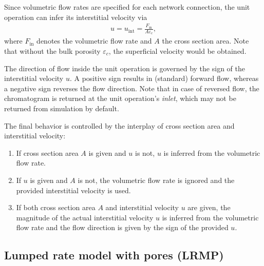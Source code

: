 Since volumetric flow rates are specified for each network connection, the unit operation can infer its interstitial velocity via
\begin{align*}
	u = u_{\text{int}} = \frac{F_{\text{in}}}{A \varepsilon_c},
\end{align*}
where $F_{\text{in}}$ denotes the volumetric flow rate and $A$ the cross section area.
Note that without the bulk porosity $\varepsilon_c$, the superficial velocity would be obtained.

The direction of flow inside the unit operation is governed by the sign of the interstitial velocity $u$.
A positive sign results in (standard) forward flow, whereas a negative sign reverses the flow direction.
Note that in case of reversed flow, the chromatogram is returned at the unit operation's \emph{inlet}, which may not be returned from simulation by default.

The final behavior is controlled by the interplay of cross section area and interstitial velocity:
\begin{enumerate}
	\item If cross section area $A$ is given and $u$ is not, $u$ is inferred from the volumetric flow rate.
	\item If $u$ is given and $A$ is not, the volumetric flow rate is ignored and the provided interstitial velocity is used.
	\item If both cross section area $A$ and interstitial velocity $u$ are given, the magnitude of the actual interstitial velocity $u$ is inferred from the volumetric flow rate and the flow direction is given by the sign of the provided $u$.
\end{enumerate}

\subsection{Lumped rate model with pores (LRMP)}\label{sec:MUOPLRMP}

